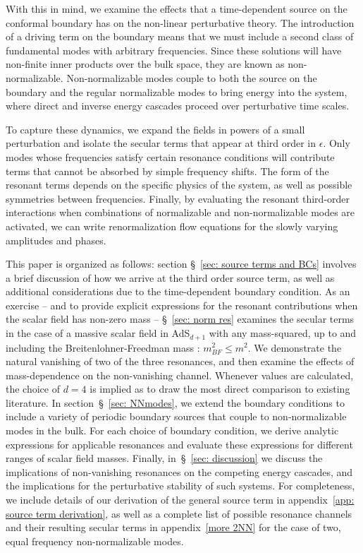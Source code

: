 \documentclass[letterpaper,11pt]{article}
\begin{document}
With this in mind, we examine the effects that a time-dependent source on the conformal boundary has on the non-linear perturbative theory. The introduction of a driving term on the boundary means that we must include a second class of fundamental modes with arbitrary frequencies. Since these solutions will have non-finite inner products over the bulk space, they are known as non-normalizable. Non-normalizable modes couple to both the source on the boundary and the regular normalizable modes to bring energy into the system, where direct and inverse energy cascades proceed over perturbative time scales.

To capture these dynamics, we expand the fields in powers of a small perturbation and isolate the secular terms that appear at third order in $\epsilon$. Only modes whose frequencies satisfy certain resonance conditions will contribute terms that cannot be absorbed by simple frequency shifts. The form of the resonant terms depends on the specific physics of the system, as well as possible symmetries between frequencies. Finally, by evaluating the resonant third-order interactions when combinations of normalizable and non-normalizable modes are activated, we can write renormalization flow equations for the slowly varying amplitudes and phases.

This paper is organized as follows: section \S\!~\ref{sec: source terms and BCs} involves a brief discussion of how we arrive at the third order source term, as well as additional considerations due to the time-dependent boundary condition. As an exercise -- and to provide explicit expressions for the resonant contributions when the scalar field has non-zero mass -- \S\!~\ref{sec: norm res} examines the secular terms in the case of a massive scalar field in AdS$_{d+1}$ with any mass-squared, up to and including the Breitenlohner-Freedman mass \cite{Breitenlohner:1982bm}: $m^2_{BF} \leq m^2$. We demonstrate the natural vanishing of two of the three resonances, and then examine the effects of mass-dependence on the non-vanishing channel. Whenever values are calculated, the choice of $d=4$ is implied as to draw the most direct comparison to existing literature. In section~\S\!~\ref{sec: NNmodes}, we extend the boundary conditions to include a variety of periodic boundary sources that couple to non-normalizable modes in the bulk. For each choice of boundary condition, we derive analytic expressions for applicable resonances and evaluate these expressions for different ranges of scalar field masses. Finally, in~\S\!~\ref{sec: discussion} we discuss the implications of non-vanishing resonances on the competing energy cascades, and the implications for the perturbative stability of such systems. For completeness, we include details of our derivation of the general source term in appendix~\ref{app: source term derivation}, as well as a complete list of possible resonance channels and their resulting secular terms in appendix~\ref{more 2NN} for the case of two, equal frequency non-normalizable modes.
\end{document}
